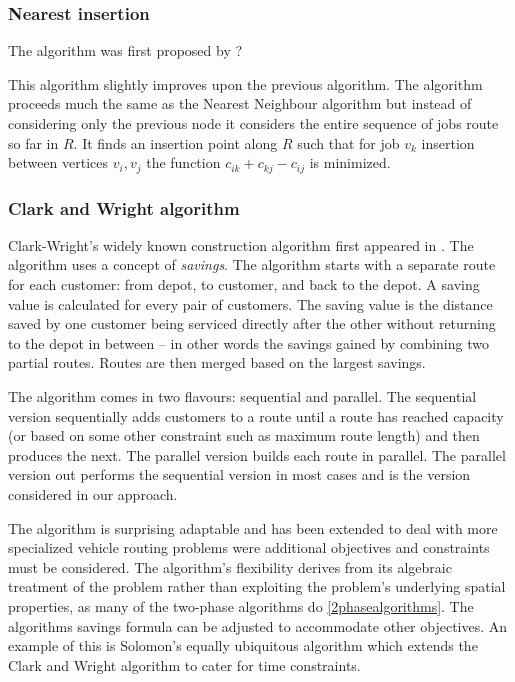\subsubsection{Nearest insertion}

The algorithm was first proposed by ?

This algorithm slightly improves upon the previous algorithm. The algorithm proceeds much the same as the Nearest Neighbour algorithm but instead of considering only the previous node it considers the entire sequence of jobs route so far in $R$. It finds an insertion point along $R$ such that for job $v_k$ insertion between vertices $v_i, v_j$ the function $c_{ik} + c_{kj} - c_{ij}$ is minimized.

\subsubsection{Clark and Wright algorithm}

Clark-Wright's widely known construction algorithm first appeared in \cite{clark:1964}. The algorithm uses a concept of \emph{savings}. The algorithm starts with a separate route for each customer: from depot, to customer, and back to the depot. A saving value is calculated for every pair of customers. The saving value is the distance saved by one customer being serviced directly after the other without returning to the depot in between -- in other words the savings gained by combining two partial routes. Routes are then merged based on the largest savings.

The algorithm comes in two flavours: sequential and parallel. The sequential version sequentially adds customers to a route until a route has reached capacity (or based on some other constraint such as maximum route length) and then produces the next. The parallel version builds each route in parallel. The parallel version out performs the sequential version in most cases\cite{Laporte:1999} and is the version considered in our approach.

The algorithm is surprising adaptable and has been extended to deal with more specialized vehicle routing problems were additional objectives and constraints must be considered. The algorithm's flexibility derives from its algebraic treatment of the problem rather than exploiting the problem's underlying spatial properties, as many of the two-phase algorithms do \ref{2phasealgorithms}. The algorithms savings formula can be adjusted to accommodate other objectives. An example of this is Solomon's equally ubiquitous algorithm \cite{Solomon:1987} which extends the Clark and Wright algorithm to cater for time constraints. 

